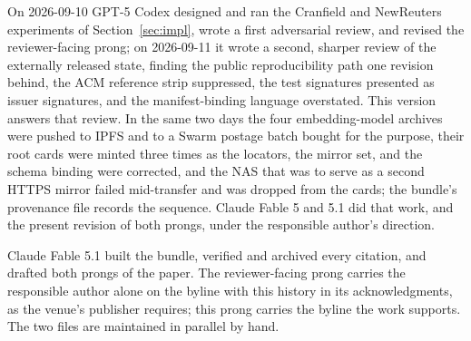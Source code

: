 \documentclass[11pt]{article}
\begin{document}
On 2026-09-10 GPT-5 Codex designed and ran the Cranfield and NewReuters
experiments of Section~\ref{sec:impl}, wrote a first adversarial review, and
revised the reviewer-facing prong; on 2026-09-11 it wrote a second, sharper
review of the externally released state, finding the public reproducibility
path one revision behind, the ACM reference strip suppressed, the test
signatures presented as issuer signatures, and the manifest-binding language
overstated. This version answers that review. In the same two days the four
embedding-model archives were pushed to IPFS and to a Swarm postage batch
bought for the purpose, their root cards were minted three times as the
locators, the mirror set, and the schema binding were corrected, and the
NAS that was to serve as a second HTTPS mirror failed mid-transfer and was
dropped from the cards; the bundle's provenance file records the sequence.
Claude Fable 5 and 5.1 did that work, and the present revision of both
prongs, under the responsible author's direction.

Claude Fable 5.1 built the bundle, verified and archived every citation, and
drafted both prongs of the paper. The reviewer-facing prong carries the
responsible author alone on the byline with this history in its
acknowledgments, as the venue's publisher requires; this prong carries the
byline the work supports. The two files are maintained in parallel by hand.

\printbibliography
\end{document}
